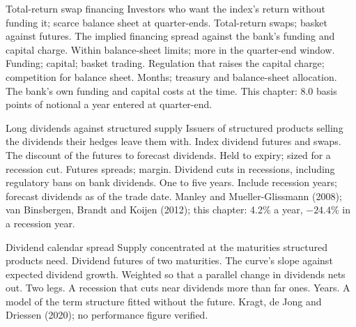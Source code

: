 \begin{strategyfile}{Total-return swap financing}\label{strat:s2:delta-one-and-dividends:trs}
 Investors who want the index's return without funding it; scarce balance sheet at quarter-ends.
 Total-return swaps; basket against futures.
 The implied financing spread against the bank's funding and capital charge.
 Within balance-sheet limits; more in the quarter-end window.
 Funding; capital; basket trading.
 Regulation that raises the capital charge; competition for balance sheet.
 Months; treasury and balance-sheet allocation.
 The bank's own funding and capital costs at the time.
 This chapter: 8.0 basis points of notional a year entered at quarter-end.
\end{strategyfile}

\begin{strategyfile}{Long dividends against structured supply}\label{strat:s2:delta-one-and-dividends:dividends}
 Issuers of structured products selling the dividends their hedges leave them with.
 Index dividend futures and swaps.
 The discount of the futures to forecast dividends.
 Held to expiry; sized for a recession cut.
 Futures spreads; margin.
 Dividend cuts in recessions, including regulatory bans on bank dividends.
 One to five years.
 Include recession years; forecast dividends as of the trade date.
 Manley and Mueller-Glissmann (2008); van Binsbergen, Brandt and Koijen (2012); this chapter: 4.2\% a year, $-24.4\%$ in a recession
year.
\end{strategyfile}

\begin{strategyfile}{Dividend calendar spread}\label{strat:s2:delta-one-and-dividends:calendar}
 Supply concentrated at the maturities structured products need.
 Dividend futures of two maturities.
 The curve's slope against expected dividend growth.
 Weighted so that a parallel change in dividends nets out.
 Two legs.
 A recession that cuts near dividends more than far ones.
 Years.
 A model of the term structure fitted without the future.
 Kragt, de Jong and Driessen (2020); no performance figure verified.
\end{strategyfile}

